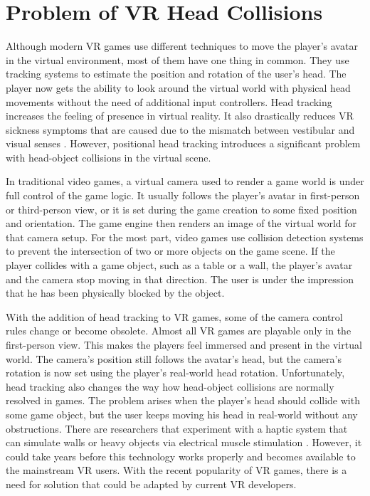 \section{Problem of VR Head Collisions}

Although modern VR games use different techniques to move the player's avatar in the virtual environment, most of them have one thing in common. They use tracking systems to estimate the position and rotation of the user's head. The player now gets the ability to look around the virtual world with physical head movements without the need of additional input controllers. Head tracking increases the feeling of presence in virtual reality. It also drastically reduces VR sickness symptoms that are caused due to the mismatch between vestibular and visual senses \cite{HEADTRACKINGSYMPTOMS}. However, positional head tracking introduces a significant problem with head-object collisions in the virtual scene.

In traditional video games, a virtual camera used to render a game world is under full control of the game logic. It usually follows the player's avatar in first-person or third-person view, or it is set during the game creation to some fixed position and orientation. The game engine then renders an image of the virtual world for that camera setup. For the most part, video games use collision detection systems to prevent the intersection of two or more objects on the game scene. If the player collides with a game object, such as a table or a wall, the player's avatar and the camera stop moving in that direction. The user is under the impression that he has been physically blocked by the object. 

With the addition of head tracking to VR games, some of the camera control rules change or become obsolete. Almost all VR games are playable only in the first-person view. This makes the players feel immersed and present in the virtual world. The camera's position still follows the avatar's head, but the camera's rotation is now set using the player’s real-world head rotation. Unfortunately, head tracking also changes the way how head-object collisions are normally resolved in games. The problem arises when the player's head should collide with some game object, but the user keeps moving his head in real-world without any obstructions. There are researchers that experiment with a haptic system that can simulate walls or heavy objects via electrical muscle stimulation \cite{HEPTICSYSTEM}. However, it could take years before this technology works properly and becomes available to the mainstream VR users. With the recent popularity of VR games, there is a need for solution that could be adapted by current VR developers.

